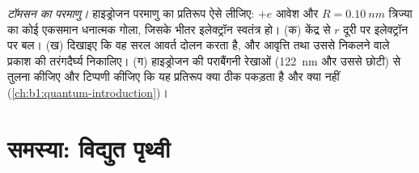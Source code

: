 \begin{exercise}[$\star\star\star$]\label{exo:b1:electrostatics-gauss:12}
\emph{टॉमसन का परमाणु।} हाइड्रोजन परमाणु का प्रतिरूप ऐसे लीजिए: $+e$ आवेश
और $R = \qty{0.10}{nm}$ त्रिज्या का कोई एकसमान धनात्मक गोला, जिसके भीतर
इलेक्ट्रॉन स्वतंत्र हो। (क) केंद्र से $r$ दूरी पर इलेक्ट्रॉन पर बल।
(ख) दिखाइए कि वह सरल आवर्त दोलन करता है, और आवृत्ति तथा उससे निकलने वाले
प्रकाश की तरंगदैर्घ्य निकालिए। (ग) हाइड्रोजन की पराबैंगनी रेखाओं
(\qty{122}{nm} और उससे छोटी) से तुलना कीजिए और टिप्पणी कीजिए कि यह प्रतिरूप
क्या ठीक पकड़ता है और क्या नहीं (\cref{ch:b1:quantum-introduction})।
\end{exercise}

\section{समस्या: विद्युत पृथ्वी}

